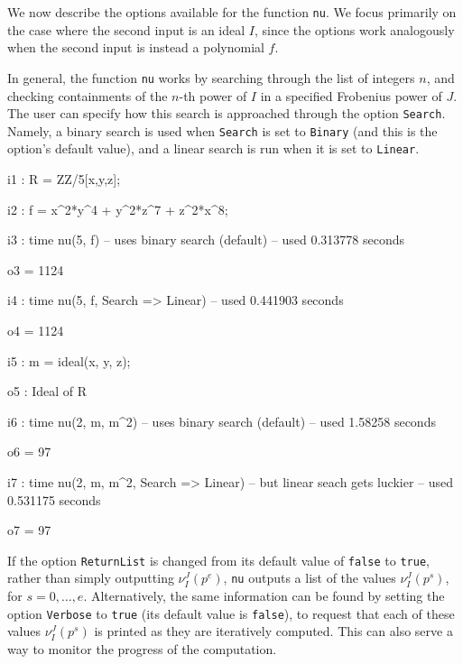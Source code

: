 \documentclass{amsart}
\begin{document}
We now describe the options available for the function {\tt nu}.  We focus primarily on the case where the second input is an ideal $I$, since the options work analogously when the second input is instead a polynomial $f$.

In general, the function {\tt nu} works by searching through the list of integers $n$, and checking containments of the $n$-th power of $I$ in a specified Frobenius power of $J$.
The user can specify how this search is approached through the  option {\tt Search}.  Namely, a binary search is used when {\tt Search} is set to {\tt Binary} (and this is the option's default value), and a linear search is run when it is set to {\tt Linear}.

{\small
{}
\begin{MyVerbatim}

i1 : R = ZZ/5[x,y,z];

i2 : f = x^2*y^4 + y^2*z^7 + z^2*x^8;

i3 : time nu(5, f) -- uses binary search (default)
     -- used 0.313778 seconds

o3 = 1124

i4 : time nu(5, f, Search => Linear)
     -- used 0.441903 seconds

o4 = 1124

i5 : m = ideal(x, y, z);

o5 : Ideal of R

i6 : time nu(2, m, m^2) -- uses binary search (default)
     -- used 1.58258 seconds

o6 = 97

i7 : time nu(2, m, m^2, Search => Linear) -- but linear seach gets luckier
     -- used 0.531175 seconds

o7 = 97
\end{MyVerbatim}
}
\medspace



If the option {\tt ReturnList} is changed from its default value of {\tt false} to {\tt true}, rather than simply outputting $\nu_I^J(p^e)$, {\tt nu} outputs a list of the values $\nu_I^J(p^s)$, for $s=0,\ldots,e$.
Alternatively, the same information can be found by setting the option {\tt Verbose} to {\tt true} (its default value is {\tt false}), to request that each of these values $\nu_I^J(p^s)$ is printed as they are iteratively computed.  This can also serve a way to monitor the progress of the computation.
\end{document}

